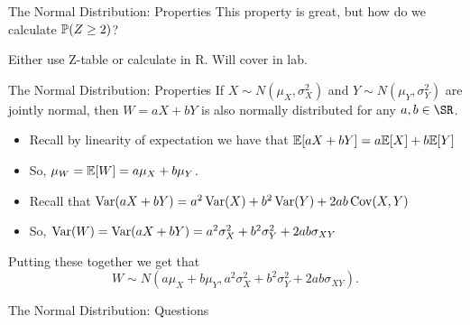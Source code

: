 \documentclass[notheorems,9pt]{beamer}
\begin{document}
\begin{frame}{The Normal Distribution: Properties} 
	\label{frame:nd-properties2}
	 This property is great, but how do we calculate \(\P(Z\geq 2)\)?	

	 Either use Z-table or calculate in R. Will cover in lab. 
\end{frame}
\begin{frame}{The Normal Distribution: Properties} 
	\label{frame:nd-properties3}
	 If \(X\sim N(\mu_X,\sigma_X^2)\) and \(Y\sim N(\mu_Y,\sigma_Y^2)\) are jointly normal, then \(W=aX+bY\) is also normally distributed for any \(a,b\in\SR\).

	\begin{itemize}
		\item Recall by linearity of expectation we have that \(\E[aX+bY] = a\E[X]+ b\E[Y]\)
		\item So, \(\mu_W = \E[W] = a\mu_X + b\mu_Y\).
	\end{itemize}
	\begin{itemize}
		\item Recall that \(\Var(aX+bY) = a^2\Var(X) + b^2\Var(Y) + 2ab\Cov(X,Y)\)
		\item So, \(\Var(W) = \Var(aX+bY) = a^2\sigma_X^2 + b^2\sigma_Y^2 + 2ab\sigma_{XY}\)
	\end{itemize}
	Putting these together we get that
	\[
		W\sim N\left(a\mu_X + b\mu_Y, a^2\sigma_X^2 + b^2\sigma_Y^2 + 2ab\sigma_{XY}\right)
	.\] 
\end{frame}
\begin{frame}{The Normal Distribution: Questions} 
	\label{frame:nd-questions}
	\centering
	{\Large
	}
\end{frame}
\end{document}
